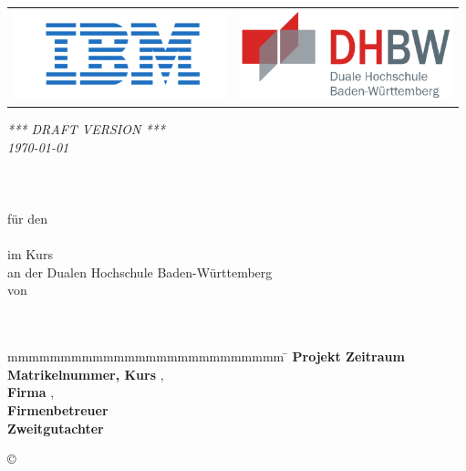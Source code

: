 \begin{titlepage}
	\begin{longtable}{p{} p{}}
		{\includegraphics[height=2.6cm]{images/logo.png}} &
		{\includegraphics[height=2.6cm]{images/dhbw.png}}
	\end{longtable}
	\enlargethispage{20mm}
	\begin{center}
		{\textit{ *** DRAFT VERSION *** \\{\tiny \today \\}}}
		{\vspace*{12mm}}
		{\LARGE\textbf{ \titel }}\\
		\vspace*{4mm}   {\large \untertitel}\\
		\vspace*{12mm}	{\large\textbf{ \arbeit}}\\
		\vspace*{8mm}  	für den\\
		\vspace*{3mm} 	{\textbf{ \abschluss}}\\
		\vspace*{12mm}	im Kurs \studiengang\\
		\vspace*{3mm} 	an der Dualen Hochschule Baden-Württemberg \dhbw\\
		\vspace*{12mm}	von\\
		\vspace*{3mm} 	{\large\textbf{ \autor}}\\
		\vspace*{12mm}	\datumAbgabe\\
	\end{center}
	\vfill
	\begin{spacing}{1.2}
		\begin{tabbing}
			mmmmmmmmmmmmmmmmmmmmmmmmmm     \= \kill
			\textbf{Projekt Zeitraum}  \>  \zeitraum\\
			\textbf{Matrikelnummer, Kurs}  \>  \matrikelnr, \kurs\\
			\textbf{Firma}      \>  \firma, \small{\textit{\firmenort}}\\
			\textbf{Firmenbetreuer}              \>  \betreuer\\
			\textbf{Zweitgutachter}             \>  \gutachter
		\end{tabbing}
	\end{spacing}
	\begin{flushright}
		\copyright{} \jahr
	\end{flushright}
\end{titlepage}
